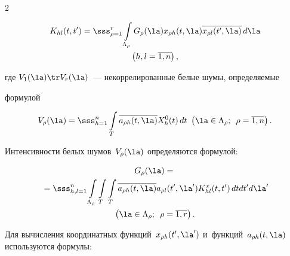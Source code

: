 \begin{multicols}{2}
\noindent

        \begin{multline}

    K_{hl}(t, t') =\sss_{\rho =1}^r \int\limits_{\Lambda_\rho} G_\rho (\la) x_{\rho h} (t,\la)\overline{x_{\rho l} (t',\la)}\, d\la\\ 

\left(h,l=\overline{1,n}\right),

\label{e2.6-s2}

\end{multline}

где $V_1(\la)\tr V_r(\la)$~--- некоррелированные белые шумы, определяемые 

формулой

        \begin{equation*}

    V_\rho (\la) = \sss_{h=1}^n  \int\limits_{T} \overline{a_{\rho h} (t,\la)} X_h^0 

(t) \,dt\  \left(\la\in \Lambda_\rho; \enskip \rho=\overline{1,n}\right).


\end{equation*}



Интенсивности белых шумов~$V_\rho (\la)$ определяются формулой:



\vspace*{-4pt}



\noindent

     \begin{multline*}

     G_\rho (\la) = {}\\

     {}=\sss_{h,l=1}^n   \int\limits_{\Lambda_\rho}\int\limits_{T}\int\limits_T 

\overline{a_{\rho h} (t,\la)}a_{\rho l}(t',\la') K_{hl}^x (t,t')\, dt 

dt'd\la'\\

 \left(\la\in \Lambda_\rho; \enskip \rho=\overline{1,r}\right).


\end{multline*}

Для вычисления координатных функций~$x_{\rho h} (t',\la')$ и~функций~$a_{\rho h} 

(t,\la)$ используются формулы:




\end{multicols}

